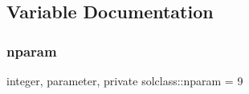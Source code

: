 \subsection{Variable Documentation}
\mbox{\label{namespacesolclass_abb5af39a08a5ff2cbe713621b2727eaf}} 
\subsubsection{\texorpdfstring{nparam}{nparam}}
{\footnotesize\ttfamily integer, parameter, private solclass\+::nparam = 9\hspace{0.3cm}{\ttfamily [private]}}

